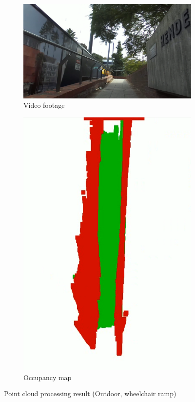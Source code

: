 \begin{figure}[p]
    \centering
    \begin{subfigure}{.6\textwidth}
        \centering
        \includegraphics[width=\linewidth]{images/pcloud_outdoor_good_video.PNG}
        \caption{Video footage}
    \end{subfigure}
    \quad
    \begin{subfigure}{.3\textwidth}
        \centering
        \includegraphics[width=\linewidth,frame]{images/pcloud_outdoor_good.PNG}
        \caption{Occupancy map}
    \end{subfigure}
    \caption{Point cloud processing result (Outdoor, wheelchair ramp)}
    \label{fig:pcloud_outdoor_good}
\end{figure}

